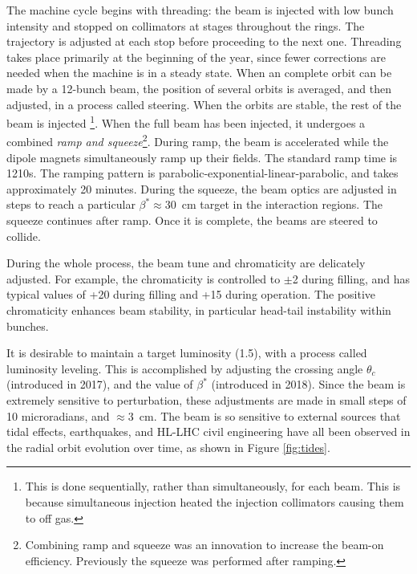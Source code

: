 The machine cycle begins with threading: the beam is injected with low bunch intensity and stopped on collimators at stages throughout the rings.
The trajectory is adjusted at each stop before proceeding to the next one.
Threading takes place primarily at the beginning of the year, since fewer corrections are needed when the machine is in a steady state.
When an complete orbit can be made by a 12-bunch beam, the position of several orbits is averaged, and then adjusted, in a process called steering.
When the orbits are stable, the rest of the beam is injected \footnote{This is done sequentially, rather than simultaneously, for each beam. This is because simultaneous injection heated the injection collimators causing them to off gas.}.
When the full beam has been injected, it undergoes a combined \emph{ramp and squeeze}\footnote{Combining ramp and squeeze was an innovation to increase the beam-on efficiency. Previously the squeeze was performed after ramping.}.
During ramp, the beam is accelerated while the dipole magnets simultaneously ramp up their fields.
The standard ramp time is 1210s. 
The ramping pattern is parabolic-exponential-linear-parabolic, and takes approximately 20 minutes. 
During the squeeze, the beam optics are adjusted in steps to reach a particular $\beta^*\approx30$~cm target in the interaction regions.
The squeeze continues after ramp.
Once it is complete, the beams are steered to collide.

During the whole process, the beam tune and chromaticity are delicately adjusted.
For example, the chromaticity is controlled to $\pm$2 during filling, and has typical values of +20 during filling and +15 during operation. \cite{lhcRun2}
The positive chromaticity enhances beam stability, in particular head-tail instability within bunches.

It is desirable to maintain a target luminosity (1.5\cms), with a process called luminosity leveling.
This is accomplished by adjusting the crossing angle $\theta_c$ (introduced in 2017), and the value of $\beta^*$ (introduced in 2018).
Since the beam is extremely sensitive to perturbation, these adjustments are made in small steps of 10 microradians, and $\approx3$~cm.
The beam is so sensitive to external sources that tidal effects, earthquakes, and HL-LHC civil engineering have all been observed in the radial orbit evolution over time, as shown in Figure \ref{fig:tides}.

